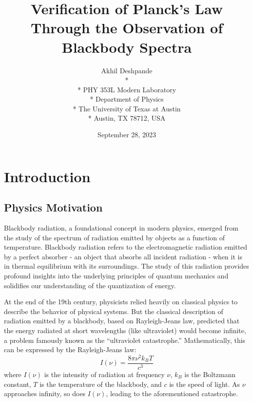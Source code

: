 \documentclass[10pt,letterpaper,onecolumn]{article}
\begin{document}
\title{Verification of Planck's Law Through the Observation of Blackbody Spectra}

\author{
 Akhil Deshpande \\*
  \\*
 PHY 353L Modern Laboratory \\*
 Department of Physics \\*
 The University of Texas at Austin \\*
 Austin, TX 78712, USA
}
\date{September 28, 2023}


\maketitle



\begin{abstract}


\end{abstract}


\section{Introduction}

\subsection{Physics Motivation}

Blackbody radiation, a foundational concept in modern physics, emerged 
from the study of the spectrum of radiation emitted by objects as a 
function of temperature. Blackbody radiation refers to the electromagnetic 
radiation emitted by a perfect absorber - an object that absorbs all 
incident radiation - when it is in thermal equilibrium with its surroundings. 
The study of this radiation provides profound insights into the underlying 
principles of quantum mechanics and solidifies our understanding of the 
quantization of energy.

At the end of the 19th century, physicists relied heavily on classical 
physics to describe the behavior of physical systems. But the classical 
description of radiation emitted by a blackbody, based on Rayleigh-Jeans 
law, predicted that the energy radiated at short wavelengths 
(like ultraviolet) would become infinite, a problem famously known as the 
``ultraviolet catastrophe.'' Mathematically, this can be expressed by the 
Rayleigh-Jeans law:
\begin{equation}
I(\nu) = \frac{8 \pi \nu^2 k_B T}{c^3}
\end{equation}
where \( I(\nu) \) is the intensity of radiation 
at frequency \( \nu \), \( k_B \) is the Boltzmann 
constant, \( T \) is the temperature of the blackbody, and \( c \) 
is the speed of light. As \( \nu \) approaches infinity, 
so does \( I(\nu) \), leading to the aforementioned catastrophe.
\end{document}
